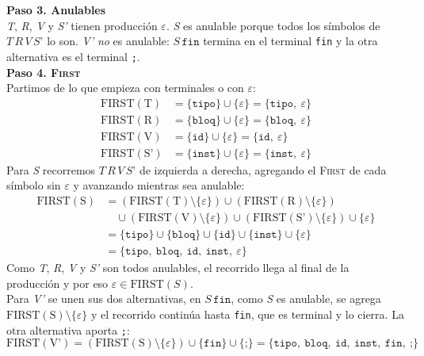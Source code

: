 \documentclass[12pt,letterpaper]{article}
\newcommand{\nt}[1]{\textit{#1}}
\newcommand{\tk}[1]{\texttt{#1}}
\newcommand{\tx}[1]{\text{#1}}
\newcommand{\First}[1]{\mathrm{FIRST}(#1)}
\newcommand{\eps}{\varepsilon}
\begin{document}
\begin{enumerate}[label=\arabic*.]
\begin{itemize}
    \textbf{Paso 3. Anulables}\\
    \nt{T}, \nt{R}, \nt{V} y \nt{S'} tienen producción $\eps$. \nt{S} es anulable porque todos los símbolos de
    $\nt{T}\,\nt{R}\,\nt{V}\,\nt{S'}$ lo son. \nt{V'} \emph{no} es anulable: $\nt{S}\,\tk{fin}$ termina en el
    terminal \tk{fin} y la otra alternativa es el terminal \tk{;}.\\

    \textbf{Paso 4. \textsc{First}}\\
    Partimos de lo que empieza con terminales o con $\eps$:
    \[
    \begin{aligned}
      \First{\tx{T}}  &= \{\tk{tipo}\} \cup \{\eps\} = \{\tk{tipo},\ \eps\} \\
      \First{\tx{R}}  &= \{\tk{bloq}\} \cup \{\eps\} = \{\tk{bloq},\ \eps\} \\
      \First{\tx{V}}  &= \{\tk{id}\} \cup \{\eps\} = \{\tk{id},\ \eps\} \\
      \First{\tx{S'}} &= \{\tk{inst}\} \cup \{\eps\} = \{\tk{inst},\ \eps\}
    \end{aligned}
    \]
    Para \nt{S} recorremos $\nt{T}\,\nt{R}\,\nt{V}\,\nt{S'}$ de izquierda a derecha, agregando el
    \textsc{First} de cada símbolo sin $\eps$ y avanzando mientras sea anulable:
    \[
    \begin{aligned}
      \First{\tx{S}} &= (\First{\tx{T}}\setminus\{\eps\}) \cup (\First{\tx{R}}\setminus\{\eps\})\\
      &\quad\cup (\First{\tx{V}}\setminus\{\eps\}) \cup (\First{\tx{S'}}\setminus\{\eps\}) \cup \{\eps\} \\
      &= \{\tk{tipo}\} \cup \{\tk{bloq}\} \cup \{\tk{id}\} \cup \{\tk{inst}\} \cup \{\eps\} \\
      &= \{\tk{tipo},\ \tk{bloq},\ \tk{id},\ \tk{inst},\ \eps\}
    \end{aligned}
    \]
    Como \nt{T}, \nt{R}, \nt{V} y \nt{S'} son todos anulables, el recorrido llega al final de la
    producción y por eso $\eps\in\First{\nt{S}}$.\\

    Para \nt{V'} se unen sus dos alternativas, en $\nt{S}\,\tk{fin}$, como \nt{S} es anulable, se agrega
    $\First{\tx{S}}\setminus\{\eps\}$ y el recorrido continúa hasta \tk{fin}, que es terminal y lo cierra.
    La otra alternativa aporta \tk{;}:
    \[
    \First{\tx{V'}} = (\First{\tx{S}}\setminus\{\eps\}) \cup \{\tk{fin}\} \cup \{\tk{;}\}
    = \{\tk{tipo},\ \tk{bloq},\ \tk{id},\ \tk{inst},\ \tk{fin},\ \tk{;}\}
    \]


\end{itemize}
\end{enumerate}
\end{document}
